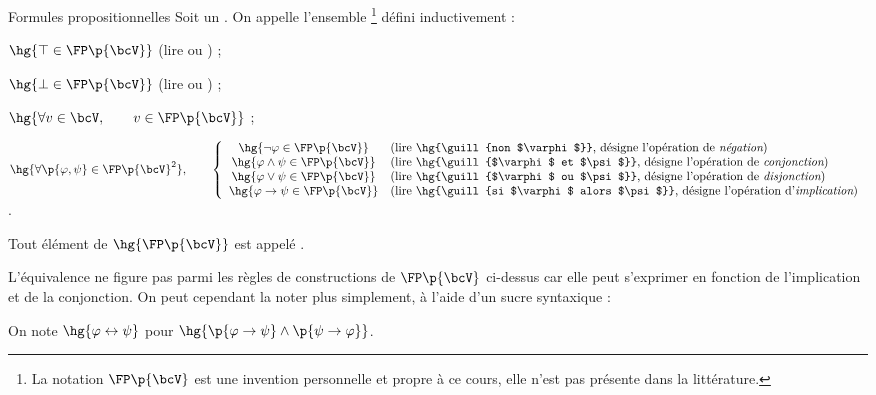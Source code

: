     \begin{definition}{Formules propositionnelles}{}
        Soit \hg{$\bcV$} un . On appelle  l'ensemble \hg{$\FP\p{\bcV}$}\footnote{La notation $\FP\p{\bcV}$ est une invention personnelle et propre à ce cours, elle n'est pas présente dans la littérature.} défini inductivement :
        \begin{enumerate}
            \itast $\hg{\top \in \FP\p{\bcV}}$ (lire  ou ) ;
            
            \itast $\hg{\bot \in \FP\p{\bcV}}$ (lire  ou ) ;
            
            \itast $\hg{\forall v \in \bcV,\qquad v \in \FP\p{\bcV}}$ ;
            
            \itast $\hg{\forall \p{\varphi, \psi} \in \FP\p{\bcV}^2},\qquad \left\lbrace\begin{array}{cl}
                \hg{\neg \varphi \in \FP\p{\bcV}} &\text{(lire \hg{\guill{non $\varphi$}}, désigne l'opération de {\itshape négation})} \\
                \hg{\varphi \land \psi \in \FP\p{\bcV}} &\text{(lire \hg{\guill{$\varphi$ et $\psi$}}, désigne l'opération de {\itshape conjonction})} \\
                \hg{\varphi \lor \psi \in \FP\p{\bcV}} &\text{(lire \hg{\guill{$\varphi$ ou $\psi$}}, désigne l'opération de {\itshape disjonction})} \\
                \hg{\varphi \rightarrow \psi \in \FP\p{\bcV}} &\text{(lire \hg{\guill{si $\varphi$ alors $\psi$}}, désigne l'opération d'{\itshape implication})}
            \end{array}\right.$.
        \end{enumerate}
        Tout élément de $\hg{\FP\p{\bcV}}$ est appelé .
    \end{definition}
    
    
    L'équivalence ne figure pas parmi les règles de constructions de $\FP\p{\bcV}$ ci-dessus car elle peut s'exprimer en fonction de l'implication et de la conjonction. On peut cependant la noter plus simplement, à l'aide d'un sucre syntaxique :
    
    \begin{notation}
        On note $\hg{\varphi \leftrightarrow \psi}$ pour $\hg{\p{\varphi \rightarrow \psi} \land \p{\psi \rightarrow \varphi}}$.
    \end{notation}
    
